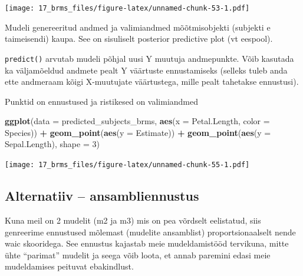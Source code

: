 \documentclass[]{book}
\newenvironment{Shaded}{\begin{snugshade}}{\end{snugshade}}
\newcommand{\KeywordTok}[1]{\textcolor[rgb]{0.13,0.29,0.53}{\textbf{#1}}}
\newcommand{\DataTypeTok}[1]{\textcolor[rgb]{0.13,0.29,0.53}{#1}}
\newcommand{\DecValTok}[1]{\textcolor[rgb]{0.00,0.00,0.81}{#1}}
\newcommand{\StringTok}[1]{\textcolor[rgb]{0.31,0.60,0.02}{#1}}
\newcommand{\OperatorTok}[1]{\textcolor[rgb]{0.81,0.36,0.00}{\textbf{#1}}}
\newcommand{\NormalTok}[1]{#1}
\begin{document}
\texttt{[image: 17\_brms\_files/figure-latex/unnamed-chunk-53-1.pdf]}

Mudeli genereeritud andmed ja valimiandmed mõõtmisobjekti (subjekti e
taimeisendi) kaupa. See on sisuliselt posterior predictive plot (vt
eespool).

\begin{Shaded}
\end{Shaded}

\texttt{predict()} arvutab mudeli põhjal uusi Y muutuja andmepunkte.
Võib kasutada ka väljamõeldud andmete pealt Y väärtuste ennustamiseks
(selleks tuleb anda ette andmeraam kõigi X-muutujate väärtustega, mille
pealt tahetakse ennustusi).

Punktid on ennustused ja ristikesed on valimiandmed

\begin{Shaded}
\begin{Highlighting}[]
\KeywordTok{ggplot}\NormalTok{(}\DataTypeTok{data =}\NormalTok{ predicted_subjects_brms, }\KeywordTok{aes}\NormalTok{(}\DataTypeTok{x =}\NormalTok{ Petal.Length, }\DataTypeTok{color =}\NormalTok{ Species)) }\OperatorTok{+}
\StringTok{  }\KeywordTok{geom_point}\NormalTok{(}\KeywordTok{aes}\NormalTok{(}\DataTypeTok{y =}\NormalTok{ Estimate)) }\OperatorTok{+}
\StringTok{  }\KeywordTok{geom_point}\NormalTok{(}\KeywordTok{aes}\NormalTok{(}\DataTypeTok{y =}\NormalTok{ Sepal.Length), }\DataTypeTok{shape =} \DecValTok{3}\NormalTok{)}
\end{Highlighting}
\end{Shaded}

\texttt{[image: 17\_brms\_files/figure-latex/unnamed-chunk-55-1.pdf]}

\subsection{Alternatiiv --
ansambliennustus}\label{alternatiiv-ansambliennustus}

Kuna meil on 2 mudelit (m2 ja m3) mis on pea võrdselt eelistatud, siis
genreerime ennustused mõlemast (mudelite ansamblist) proportsionaalselt
nende waic skooridega. See ennustus kajastab meie mudeldamistööd
tervikuna, mitte ühte ``parimat'' mudelit ja seega võib loota, et annab
paremini edasi meie mudeldamises peituvat ebakindlust.
\end{document}
